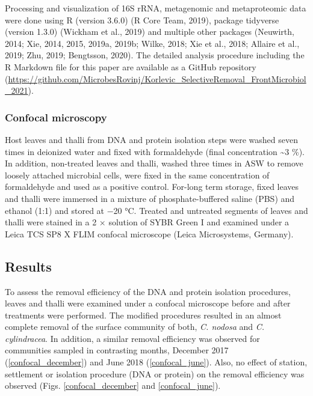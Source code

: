 \documentclass[12pt,]{article}
\begin{document}
Processing and visualization of 16S rRNA, metagenomic and metaproteomic
data were done using R (version 3.6.0) (R Core Team, 2019), package
tidyverse (version 1.3.0) (Wickham et al., 2019) and multiple other
packages (Neuwirth, 2014; Xie, 2014, 2015, 2019a, 2019b; Wilke, 2018;
Xie et al., 2018; Allaire et al., 2019; Zhu, 2019; Bengtsson, 2020). The
detailed analysis procedure including the R Markdown file for this paper
are available as a GitHub repository
(\url{https://github.com/MicrobesRovinj/Korlevic_SelectiveRemoval_FrontMicrobiol_2021}).

\hypertarget{confocal-microscopy}{%
\subsubsection{Confocal microscopy}\label{confocal-microscopy}}

Host leaves and thalli from DNA and protein isolation steps were washed
seven times in deionized water and fixed with formaldehyde (final
concentration \textasciitilde{}3 \si{\percent}). In addition,
non-treated leaves and thalli, washed three times in ASW to remove
loosely attached microbial cells, were fixed in the same concentration
of formaldehyde and used as a positive control. For-long term storage,
fixed leaves and thalli were immersed in a mixture of phosphate-buffered
saline (PBS) and ethanol (1:1) and stored at \num{-20}
\si{\degreeCelsius}. Treated and untreated segments of leaves and thalli
were stained in a 2 × solution of SYBR Green I and examined under a
Leica TCS SP8 X FLIM confocal microscope (Leica Microsystems, Germany).

\newpage

\hypertarget{results}{%
\subsection{Results}\label{results}}

To assess the removal efficiency of the DNA and protein isolation
procedures, leaves and thalli were examined under a confocal microscope
before and after treatments were performed. The modified procedures
resulted in an almost complete removal of the surface community of both,
\emph{C. nodosa} and \emph{C. cylindracea}. In addition, a similar
removal efficiency was observed for communities sampled in contrasting
months, December 2017 (\autoref{confocal_december}) and June 2018
(\autoref{confocal_june}). Also, no effect of station, settlement or
isolation procedure (DNA or protein) on the removal efficiency was
observed (Figs. \ref{confocal_december} and \ref{confocal_june}).
\end{document}
